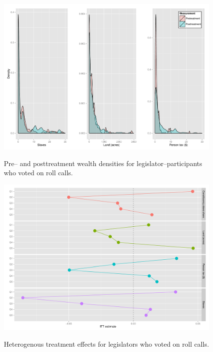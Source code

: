 \documentclass{beamer}
\begin{document}
\begin{frame}
\begin{figure}[htbp]
\begin{center}
      \caption{Pre-- and posttreatment wealth densities for legislator--participants who voted on roll calls.}
   \includegraphics[scale=0.33]{wealth-plot.pdf} 
   \label{wealth-plot}
   \end{center}
\end{figure}
\end{frame}

\begin{frame}
\begin{figure}[htbp]
\begin{center}
      \caption{Heterogenous treatment effects for legislators who voted on roll calls.}
   \includegraphics[scale=0.35]{het-plot-assembly.pdf} 
   \label{het-plot-assembly}
   \end{center}
\end{figure}
\end{frame}
\end{document}
